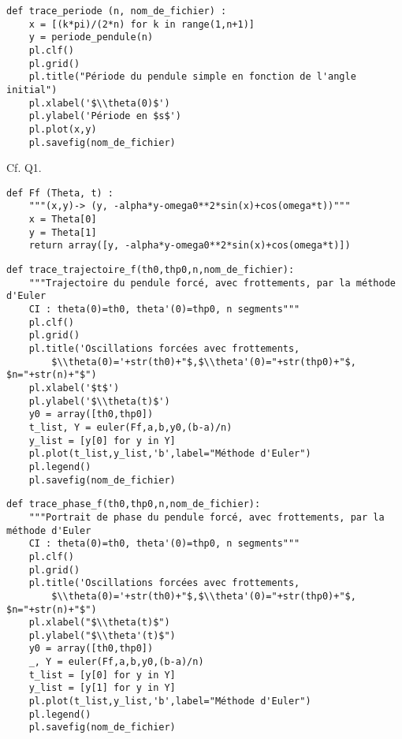 \question{}
\begin{lstlisting}
def trace_periode (n, nom_de_fichier) :
    x = [(k*pi)/(2*n) for k in range(1,n+1)]
    y = periode_pendule(n)
    pl.clf()
    pl.grid()
    pl.title("Période du pendule simple en fonction de l'angle initial")
    pl.xlabel('$\\theta(0)$')
    pl.ylabel('Période en $s$')
    pl.plot(x,y)
    pl.savefig(nom_de_fichier)
\end{lstlisting}

\question{} Cf. Q1.

\question{}
\begin{lstlisting}
def Ff (Theta, t) :
    """(x,y)-> (y, -alpha*y-omega0**2*sin(x)+cos(omega*t))"""    
    x = Theta[0]
    y = Theta[1]
    return array([y, -alpha*y-omega0**2*sin(x)+cos(omega*t)])
\end{lstlisting}

\question{}
\begin{lstlisting}
def trace_trajectoire_f(th0,thp0,n,nom_de_fichier):
    """Trajectoire du pendule forcé, avec frottements, par la méthode d'Euler
    CI : theta(0)=th0, theta'(0)=thp0, n segments"""
    pl.clf()
    pl.grid()
    pl.title('Oscillations forcées avec frottements, 
        $\\theta(0)='+str(th0)+"$,$\\theta'(0)="+str(thp0)+"$, $n="+str(n)+"$")
    pl.xlabel('$t$')
    pl.ylabel('$\\theta(t)$')
    y0 = array([th0,thp0])
    t_list, Y = euler(Ff,a,b,y0,(b-a)/n)
    y_list = [y[0] for y in Y]
    pl.plot(t_list,y_list,'b',label="Méthode d'Euler")
    pl.legend()
    pl.savefig(nom_de_fichier)
\end{lstlisting}

\question{}
\begin{lstlisting}
def trace_phase_f(th0,thp0,n,nom_de_fichier):
    """Portrait de phase du pendule forcé, avec frottements, par la méthode d'Euler
    CI : theta(0)=th0, theta'(0)=thp0, n segments"""
    pl.clf()
    pl.grid()
    pl.title('Oscillations forcées avec frottements, 
        $\\theta(0)='+str(th0)+"$,$\\theta'(0)="+str(thp0)+"$, $n="+str(n)+"$")
    pl.xlabel("$\\theta(t)$")
    pl.ylabel("$\\theta'(t)$")
    y0 = array([th0,thp0])
    _, Y = euler(Ff,a,b,y0,(b-a)/n)
    t_list = [y[0] for y in Y]
    y_list = [y[1] for y in Y]
    pl.plot(t_list,y_list,'b',label="Méthode d'Euler")
    pl.legend()
    pl.savefig(nom_de_fichier)
\end{lstlisting}

